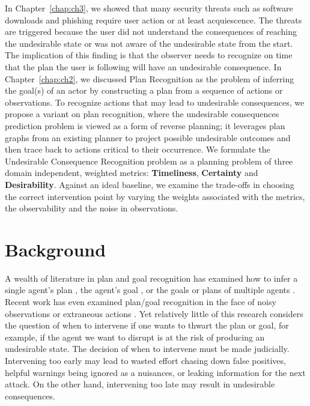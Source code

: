 In Chapter~\ref{chap:ch3}, we showed that many security threats such as software downloads and phishing require user action or at least acquiescence. 
The threats are triggered because the user did not understand the consequences of reaching the undesirable state or was not aware of the undesirable state from the start.
The implication of this finding is that the observer needs to recognize on time that the plan the user is following will have an undesirable consequence.
In Chapter~\ref{chap:ch2}, we discussed Plan Recognition as the problem of inferring the goal(s) of an actor by constructing a plan from a sequence of actions or observations.
To recognize actions that may lead to undesirable consequences, we propose a variant on plan recognition, where the undesirable consequences prediction problem is viewed as a form of reverse planning; it leverages plan graphs from an existing planner to project possible undesirable outcomes and then trace back to actions critical to their occurrence.
We formulate the Undesirable Consequence Recognition problem as a planning problem of three domain independent, weighted metrics: \textbf{Timeliness}, \textbf{Certainty} and \textbf{Desirability}. 
Against an ideal baseline, we examine the trade-offs in choosing the correct intervention point by varying the weights associated with the metrics, the observability and the noise in observations.

\section{Background}
A wealth of literature in plan and goal recognition has examined how to infer a single agent's plan \cite{GeibGoldman09, ramirez2009plan}, the agent's goal \cite{ramirez2011goalrecog, yin2004high}, or the goals or plans of multiple agents \cite{banerjee2010mpr, kaminka2002monitoring}. Recent work has even examined plan/goal recognition in the face of noisy observations \cite{geib2005partial, vattam2015case} or extraneous actions \cite{gal2012plan, sohrabi2016finding}. 
Yet relatively little of this research considers the question of when to intervene if one wants to thwart the plan or goal, for example, if the agent we want to disrupt is at the risk of producing an undesirable state. 
The decision of when to intervene must be made judicially. 
Intervening too early may lead to wasted effort chasing down false positives, helpful warnings being ignored as a nuisances, or leaking information for the next attack. 
On the other hand, intervening too late may result in undesirable consequences.

